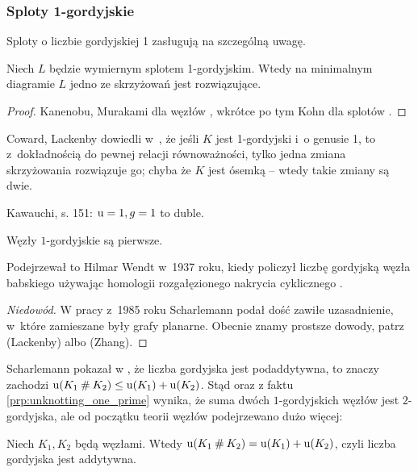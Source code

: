 
\subsubsection{Sploty 1-gordyjskie}
Sploty o liczbie gordyjskiej 1 zasługują na szczególną uwagę.

\begin{proposition}
%
    Niech $L$ będzie wymiernym splotem 1-gordyjskim.
    Wtedy na minimalnym diagramie $L$ jedno ze skrzyżowań jest rozwiązujące.
\end{proposition}

\begin{proof}
%
%
%
    Kanenobu, Murakami dla węzłów \cite{kanenobumurakami86}, wkrótce po tym Kohn dla splotów \cite{kohn91}.
\end{proof}

Coward, Lackenby dowiedli w~\cite{coward11}, że jeśli $K$ jest 1-gordyjski i~o genusie 1, to z~dokładnością do pewnej relacji równoważności, tylko jedna zmiana skrzyżowania rozwiązuje go; chyba że $K$ jest ósemką -- wtedy takie zmiany są dwie.
%
%

\begin{tobedone}
    Kawauchi, s. 151: $\operatorname{u} = 1, g = 1$ to duble.
\end{tobedone}

\begin{proposition}
\label{prp:unknotting_one_prime}%
    Węzły $1$-gordyjskie są pierwsze.
\end{proposition}

Podejrzewał to Hilmar Wendt w~1937 roku, kiedy policzył liczbę gordyjską węzła babskiego używając homologii rozgałęzionego nakrycia cyklicznego \cite{wendt37}.
%

\begin{proof}[Niedowód]
%
%
%
    W pracy \cite{scharlemann85} z~1985 roku Scharlemann podał dość zawiłe uzasadnienie, w~które zamieszane były grafy planarne.
    Obecnie znamy prostsze dowody, patrz \cite{lackenby97} (Lackenby) albo \cite{zhang91} (Zhang).
\end{proof}

Scharlemann pokazał w \cite[wniosek 1.6]{scharlemann98}, że liczba gordyjska jest podaddytywna, to znaczy zachodzi $\operatorname{u}(K_1 \mathbin{\#} K_2) \le \operatorname{u}(K_1) + \operatorname{u}(K_2)$.
Stąd oraz z faktu \ref{prp:unknotting_one_prime} wynika, że suma dwóch $1$-gordyjskich węzłów jest $2$-gordyjska, ale od początku teorii węzłów podejrzewano dużo więcej:

\begin{conjecture}
%
    Niech $K_1, K_2$ będą węzłami.
    Wtedy $\operatorname{u} (K_1 \mathbin{\#} K_2) = \operatorname{u}(K_1) + \operatorname{u}(K_2)$, czyli liczba gordyjska jest addytywna.
\end{conjecture}

